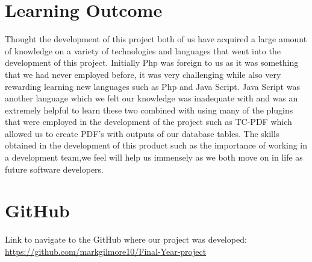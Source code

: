 \section{Learning Outcome}
Thought the development of this project both of us have acquired a large amount of knowledge on a variety of technologies and languages that went into the development of this project. Initially Php was foreign to us as it was something that we had never employed before, it was very challenging while also very rewarding learning  new languages such as  Php and Java Script. Java Script was another language which we felt our knowledge was inadequate with and was an extremely helpful to learn these two combined with using many of the plugins that were employed in the development of the project such as TC-PDF which allowed us to create PDF's with outputs of our database tables. The skills obtained in the development of this product such as the importance of working in a development team,we feel will help us immensely as we both move on in life as future software developers.

\section{GitHub}
Link to navigate to the GitHub where our project was developed:
\newline
\url{https://github.com/markgilmore10/Final-Year-project}